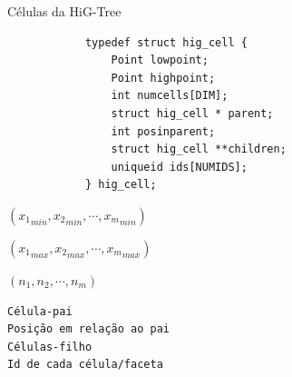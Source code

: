 \documentclass[../main/main.tex]{subfiles}
\begin{document}
\begin{frame}[fragile]{\smaller \smaller Células da HiG-Tree}
	\begin{minipage}{0.45\textwidth}
		\begin{verbatim}
			typedef struct hig_cell {
				Point lowpoint;
				Point highpoint;
				int numcells[DIM];
				struct hig_cell * parent;
				int posinparent;
				struct hig_cell **children;
				uniqueid ids[NUMIDS];
			} hig_cell;
		\end{verbatim}
	\end{minipage}
	\hfill
	\begin{minipage}{0.45\textwidth}
		\vspace{-.1cm}
		$({x_1}_{min},{x_2}_{min},\cdots,{x_m}_{min})$
		
		$({x_1}_{max},{x_2}_{max},\cdots,{x_m}_{max})$
		
		$(n_1, n_2, \cdots, n_m)$
		\vspace{-.3cm}
		\begin{verbatim}
Célula-pai
Posição em relação ao pai
Células-filho
Id de cada célula/faceta
		\end{verbatim}
		
	\end{minipage}
\end{frame}
\end{document}
